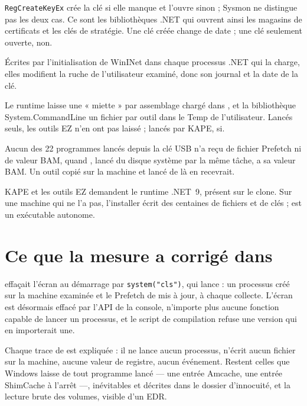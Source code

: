 \documentclass[11pt,a4paper,oneside]{report}
\begin{document}
\begin{description}[style=nextline,leftmargin=1em]
  \item[Ouverture en création] \texttt{RegCreateKeyEx} crée la clé si elle manque
        et l'ouvre sinon ; Sysmon ne distingue pas les deux cas. Ce sont les
        bibliothèques .NET qui ouvrent ainsi les magasins de certificats et les
        clés de stratégie. Une clé créée change de date ; une clé seulement
        ouverte, non.
  \item[Les valeurs \texttt{ZoneMap}] Écrites par l'initialisation de WinINet dans
        chaque processus .NET qui la charge, elles modifient la ruche
         de l'utilisateur examiné, donc son journal et la date
        de la clé.
  \item[Les fichiers .NET] Le runtime laisse une « miette » par assemblage chargé
        dans , et la bibliothèque System.CommandLine un
        fichier par outil dans le Temp de l'utilisateur. Lancés seuls, les
        outils EZ n'en ont pas laissé ; lancés par KAPE, si.
  \item[Prefetch et BAM] Aucun des 22 programmes lancés depuis la clé USB n'a
        reçu de fichier Prefetch ni de valeur BAM, quand , lancé
        du disque système par la même tâche, a sa valeur BAM. Un outil copié sur la machine et lancé de
        là en recevrait.
  \item[Le prérequis .NET] KAPE et les outils EZ demandent le runtime .NET~9,
        présent sur le clone. Sur une machine qui ne l'a pas, l'installer écrit
        des centaines de fichiers et de clés ; \wac{} est un exécutable autonome.
\end{description}

\section{Ce que la mesure a corrigé dans \wac{}}

\wac{} effaçait l'écran au démarrage par \texttt{system("cls")}, qui lance
 : un processus créé sur la machine examinée et le Prefetch de
 mis à jour, à chaque collecte. L'écran est désormais effacé par
l'API de la console, \wac{} n'importe plus aucune fonction capable de lancer un
processus, et le script de compilation refuse une version qui en importerait
une.

\begin{note}
Chaque trace de \wac{} est expliquée : il ne lance aucun processus, n'écrit
aucun fichier sur la machine, aucune valeur de registre, aucun événement. Restent
celles que Windows laisse de tout programme lancé --- une entrée Amcache, une
entrée ShimCache à l'arrêt ---, inévitables et décrites dans le dossier
d'innocuité, et la lecture brute des volumes, visible d'un EDR.
\end{note}
\end{document}
